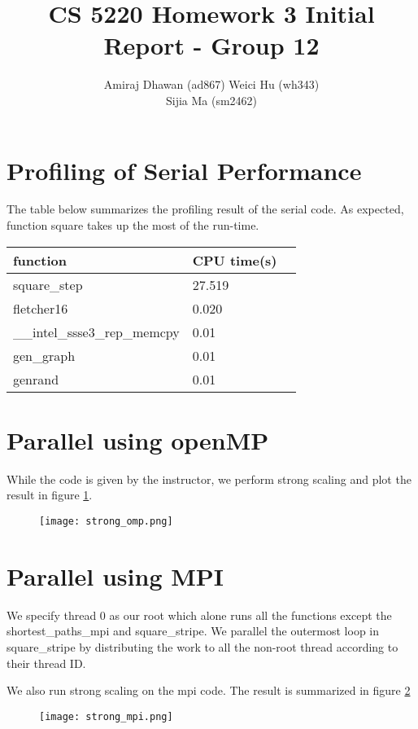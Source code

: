 \documentclass{article}
\title{CS 5220 Homework 3 Initial Report - Group 12}
\author{Amiraj Dhawan (ad867)
		Weici Hu (wh343)\\
        Sijia Ma (sm2462)}
\begin{document}
\maketitle

\section{Profiling of Serial Performance}
The table below summarizes the profiling result of the serial code. As expected, function square takes up the most of the run-time.
\begin{center}\label{t1}
    \begin{tabular}{ | l | l | l |}
    \hline
    function & CPU time(s)  \\ \hline
    square\_step & 27.519 \\ \hline
    fletcher16 & 0.020 \\ \hline
    \_\_intel\_ssse3\_rep\_memcpy & 0.01\\ \hline
    gen\_graph & 0.01\\ \hline
    genrand & 0.01\\ \hline
    \end{tabular}
\end{center}
\section{Parallel using openMP}
While the code is given by the instructor, we perform strong scaling and plot the result in figure \ref{f1}.
\begin{figure}
	\centering
  \texttt{[image: strong\_omp.png]}
  \caption{}\label{f1}
\end{figure}
\section{Parallel using MPI}
We specify thread 0 as our root which alone runs all the functions except the shortest\_paths\_mpi and square\_stripe. We parallel the outermost loop in square\_stripe by distributing the work to all the non-root thread according to their thread ID. 
 
We also run strong scaling on the mpi code. The result is summarized in figure \ref{2}
\begin{figure}[h!]
	\centering
  \texttt{[image: strong\_mpi.png]}
  \caption{}\label{2}
\end{figure}
\end{document}
